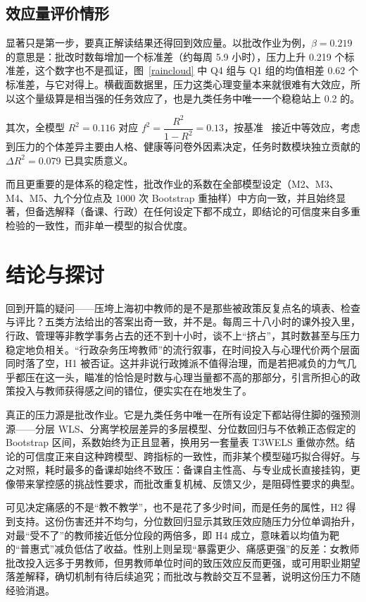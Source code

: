 \documentclass[zihao = -4, linespread = 1.5]{article}
\begin{document}
\subsection{效应量评价情形}
显著只是第一步，要真正解读结果还得回到效应量。以批改作业为例，$\beta=0.219$ 的意思是：批改时数每增加一个标准差（约每周 5.9 小时），压力上升 0.219 个标准差，这个数字也不是孤证，图~\ref{raincloud} 中 Q4 组与 Q1 组的均值相差 0.62 个标准差，与它对得上。横截面数据里，压力这类心理变量本来就很难有大效应，所以这个量级算是相当强的任务效应了，也是九类任务中唯一一个稳稳站上 0.2 的。

其次，全模型 $R^2=0.116$ 对应 $f^2 = \dfrac{R^2}{1-R^2}=0.13$，按基准~\citep{Cohen} 接近中等效应，考虑到压力的个体差异主要由人格、健康等问卷外因素决定，任务时数模块独立贡献的 $\Delta R^2=0.079$ 已具实质意义。

而且更重要的是体系的稳定性，批改作业的系数在全部模型设定（M2、M3、M4、M5、九个分位点及 1000 次 Bootstrap 重抽样）中方向一致，并且始终显著，但备选解释（备课、行政）在任何设定下都不成立，即结论的可信度来自多重检验的一致性，而非单一模型的拟合优度。



\section{结论与探讨}
回到开篇的疑问——压垮上海初中教师的是不是那些被政策反复点名的填表、检查与评比？五类方法给出的答案出奇一致，并不是。每周三十八小时的课外投入里，行政、管理等非教学事务占去的还不到十小时，谈不上“挤占”，其时数甚至与压力稳定地负相关。“行政杂务压垮教师”的流行叙事，在时间投入与心理代价两个层面同时落了空，H1 被否证。这并非说行政摊派不值得治理，而是若把减负的力气几乎都压在这一头，瞄准的恰恰是时数与心理当量都不高的那部分，引言所担心的政策投入与教师获得感之间的错位，便实实在在地发生了。

真正的压力源是批改作业。它是九类任务中唯一在所有设定下都站得住脚的强预测源——分层 WLS、分离学校层差异的多层模型、分位数回归与不依赖正态假定的 Bootstrap 区间，系数始终为正且显著，换用另一套量表 T3WELS 重做亦然。结论的可信度正来自这种跨模型、跨指标的一致性，而非某个模型碰巧拟合得好。与之对照，耗时最多的备课却始终不致压：备课自主性高、与专业成长直接挂钩，更像带来掌控感的挑战性要求，而批改重复机械、反馈又少，是阻碍性要求的典型。

可见决定痛感的不是“教不教学”，也不是花了多少时间，而是任务的属性，H2 得到支持。这份伤害还并不均匀，分位数回归显示其致压效应随压力分位单调抬升，对最“受不了”的教师接近低分位段的两倍多，即 H4 成立，意味着以均值为靶的“普惠式”减负低估了收益。性别上则呈现“暴露更少、痛感更强”的反差：女教师批改投入远多于男教师，但男教师单位时间的致压效应反而更强，或可用职业期望落差解释，确切机制有待后续追究；而批改与教龄交互不显著，说明这份压力不随经验消退。
\end{document}
